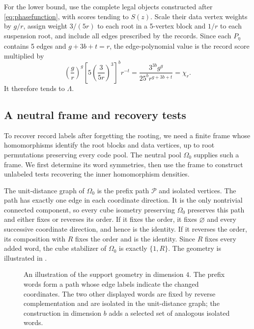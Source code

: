 \documentclass[10pt]{article}
\numberwithin{equation}{section}
\theoremstyle{definition}
\begin{document}
For the lower bound, use the complete legal objects constructed after \eqref{eq:phasefunction}, with scores tending to $S(z)$. Scale their data vertex weights by $g/r$, assign weight $3/(5r)$ to each root in a 5-vertex block and $1/r$ to each suspension root, and include all edges prescribed by the records. Since each $P_\eta$ contains 5 edges and $g+3b+t=r$, the edge-polynomial value is the record score multiplied by
\[
 \left(\frac gr\right)^g
 \left[5\left(\frac{3}{5r}\right)^3\right]^b r^{-t}
 =\frac{3^{3b}g^g}{25^b r^{g+3b+t}}=\chi_r.
\]
It therefore tends to $\Lambda$.

\subsection{A neutral frame and recovery tests}
To recover record labels after forgetting the rooting, we need a finite frame whose homomorphisms identify the root blocks and data vertices, up to root permutations preserving every code pool. The neutral pool $\Omega_0$ supplies such a frame. We first determine its word symmetries, then use the frame to construct unlabeled tests recovering the inner homomorphism densities.

The unit-distance graph of $\Omega_0$ is the prefix path $\mathcal P$ and isolated vertices. The path has exactly one edge in each coordinate direction. It is the only nontrivial connected component, so every cube isometry preserving $\Omega_0$ preserves this path and either fixes or reverses its order. If it fixes the order, it fixes $\varnothing$ and every successive coordinate direction, and hence is the identity. If it reverses the order, its composition with $R$ fixes the order and is the identity. Since $R$ fixes every added word, the cube stabilizer of $\Omega_0$ is exactly $\{1,R\}$. The geometry is illustrated in .

\begin{figure}[htbp]
\centering
{}
\caption{An illustration of the support geometry in dimension $4$. The prefix words form a path whose edge labels indicate the changed coordinates. The two other displayed words are fixed by reverse complementation and are isolated in the unit-distance graph; the construction in dimension $b$ adds a selected set of analogous isolated words.}
\label{fig:prefixframe}
\end{figure}
\end{document}
